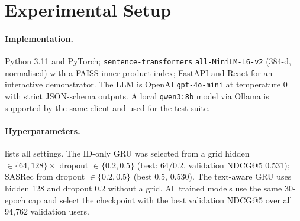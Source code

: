 \documentclass[11pt,a4paper]{article}
\begin{document}
\section{Experimental Setup}
\label{sec:setup}

\paragraph{Implementation.} Python 3.11 and PyTorch; \texttt{sentence-transformers}
\texttt{all-MiniLM-L6-v2} (384-d, normalised) with a FAISS \citep{johnson2019billion}
inner-product index; FastAPI and React for an interactive demonstrator. The LLM is OpenAI
\texttt{gpt-4o-mini} at temperature 0 with strict JSON-schema outputs. A local
\texttt{qwen3:8b} model via Ollama is supported by the same client and used for the test suite.

\paragraph{Hyperparameters.}  lists all settings. The ID-only GRU was selected
from a grid hidden $\in\{64,128\}\times$ dropout $\in\{0.2,0.5\}$ (best: 64/0.2, validation
NDCG@5 $0.531$); SASRec from dropout $\in\{0.2,0.5\}$ (best 0.5, $0.530$). The text-aware GRU
uses hidden 128 and dropout 0.2 without a grid. All trained models use the same 30-epoch cap and
select the checkpoint with the best validation NDCG@5 over all 94{,}762 validation users.
\end{document}
